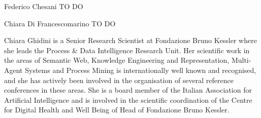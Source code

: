 \documentclass[10pt,journal,compsoc]{IEEEtran}
\theoremstyle{definition}
\theoremstyle{plain}
\begin{document}


%




%











\begin{IEEEbiography}{Federico Chesani}
TO DO
\end{IEEEbiography}

\begin{IEEEbiography}{Chiara Di Francescomarino}
TO DO
\end{IEEEbiography}

\begin{IEEEbiography}{Chiara Ghidini}
is a Senior Research Scientist at Fondazione Bruno Kessler where she leads the Process \& Data Intelligence Research Unit.  
Her scientific work in the areas of Semantic Web, Knowledge Engineering and Representation, Multi-Agent Systems and Process Mining is internationally well known and recognised, and she has actively been involved in the organisation of several reference conferences in these areas. She is a board member of the Italian Association for Artificial Intelligence and is involved in the scientific coordination of the Centre for Digital Health and Well Being of Head of Fondazione Bruno Kessler.
\end{IEEEbiography}
\end{document}
